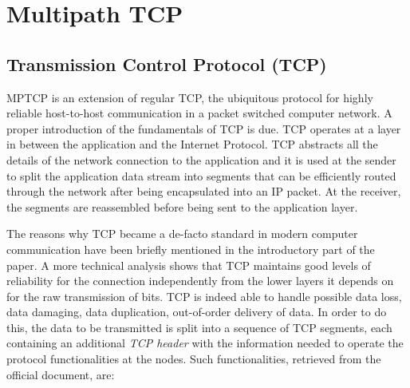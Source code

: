 \chapter{Multipath TCP}
\label{chap:multipathtcp}

\section{Transmission Control Protocol (TCP)}
MPTCP is an extension of regular TCP, the ubiquitous protocol for highly reliable host-to-host communication in a packet switched computer network. A proper introduction of the fundamentals of TCP is due.
TCP operates at a layer in between the application and the Internet Protocol. TCP abstracts all the details of the network connection to the application and it is used at the sender to split the application data stream into segments that can be efficiently routed through the network after being encapsulated into an IP packet. At the receiver, the segments are reassembled before being sent to the application layer.

The reasons why TCP became a de-facto standard in modern computer communication have been briefly mentioned in the introductory part of the paper. A more technical analysis shows that TCP maintains good levels of reliability for the connection independently from the lower layers it depends on for the raw transmission of bits. TCP is indeed able to handle possible data loss, data damaging, data duplication, out-of-order delivery of data. In order to do this, the data to be transmitted is split into a sequence of TCP segments, each containing an additional \textit{TCP header} with the information needed to operate the protocol functionalities at the nodes. Such functionalities, retrieved from the official  document, are:

